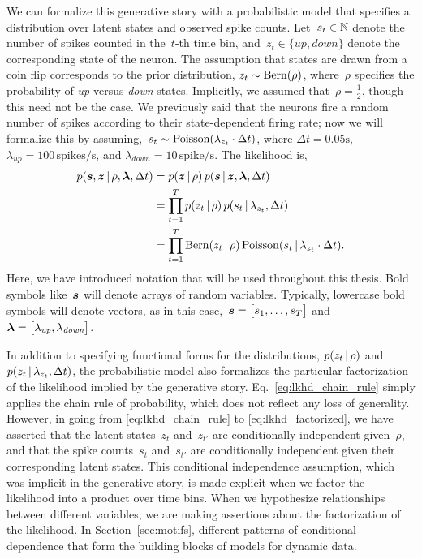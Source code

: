 \sloppy We can formalize this generative story with a probabilistic
model that specifies a distribution over latent states and
observed spike counts. Let~$s_t \in \mathbb{N}$ denote the number of
spikes counted in the~$t$-th time bin,
and~$z_t \in \{\textit{up}, \textit{down}\}$ denote the corresponding
state of the neuron. The assumption that states are drawn from a coin
flip corresponds to the prior distribution,
${z_t \sim \mathrm{Bern}(\rho)}$, where~$\rho$ specifies the
probability of \textit{up} versus \textit{down} states.  Implicitly,
we assumed that~${\rho=\tfrac{1}{2}}$, though this need not be the
case.  We previously said that the neurons fire a random number of
spikes according to their state-dependent firing rate; now we will
formalize this by
assuming,~${s_{t} \sim \mathrm{Poisson}(\lambda_{z_t} \cdot \Delta t)}$,
where ${\Delta t = 0.05\text{s}}$,
${\lambda_{\textit{up}} = 100\,\text{spikes/s}}$, and
${\lambda_{\textit{down}} = 10\,\text{spike/s}}$. 
The likelihood is,
\begin{align}
  \label{eq:lkhd_chain_rule}
  p(\boldsymbol{s}, \boldsymbol{z} \,|\, \rho, \boldsymbol{\lambda}, \Delta t) 
  &= p(\boldsymbol{z} \,|\, \rho) \, p(\boldsymbol{s} \,|\, \boldsymbol{z}, \boldsymbol{\lambda}, \Delta t) \\
  \label{eq:lkhd_factorized}
  &= \prod_{t=1}^T p(z_t \,|\, \rho) \, p(s_t \,|\, \lambda_{z_t}, \Delta t) \\
  &= \prod_{t=1}^T \mathrm{Bern}(z_t \,|\, \rho) \, \mathrm{Poisson}(s_t \,|\, \lambda_{z_t} \cdot \Delta t).
\end{align} 
Here, we have introduced notation that will be used throughout this
thesis. Bold symbols like~$\boldsymbol{s}$ will denote arrays of
random variables. Typically, lowercase bold symbols will denote
vectors, as in this case,~${\boldsymbol{s} = \big[s_1, \ldots, s_T \big]}$ 
and~${\boldsymbol{\lambda} = \big[ \lambda_{\textit{up}}, \lambda_{\textit{down}} \big]}$.

In addition to specifying functional forms for the distributions,
${p(z_t \,|\, \rho)}$ and~${p(z_t \,|\, \lambda_{z_t}, \Delta t)}$,
the probabilistic model also formalizes the particular factorization of
the likelihood implied by the generative story.
Eq.~\ref{eq:lkhd_chain_rule} simply applies the chain rule of
probability, which does not reflect any loss of generality. However,
in going from \eqref{eq:lkhd_chain_rule} to
\eqref{eq:lkhd_factorized}, we have asserted that the latent
states~$z_t$ and~$z_{t'}$ are conditionally independent given~$\rho$,
and that the spike counts~$s_{t}$ and~$s_{t'}$ are conditionally
independent given their corresponding latent states. This conditional
independence assumption, which was implicit in the generative story,
is made explicit when we factor the likelihood into a product
over time bins. When we hypothesize relationships between different variables,
we are making assertions about the factorization of the likelihood. 
In Section~\ref{sec:motifs}, different patterns of conditional dependence 
that form the building blocks of models for dynamic data.


